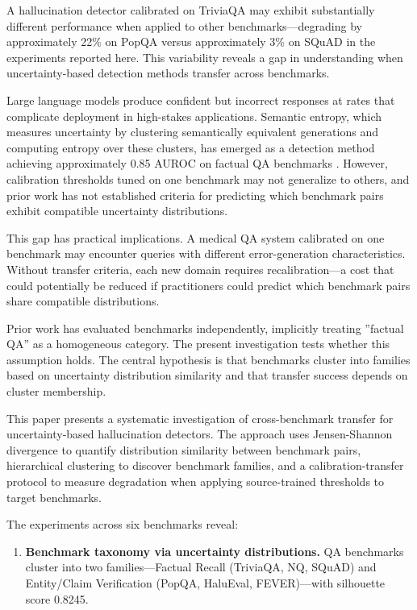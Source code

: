 
A hallucination detector calibrated on TriviaQA may exhibit substantially different performance when applied to other benchmarks---degrading by approximately 22\% on PopQA versus approximately 3\% on SQuAD in the experiments reported here. This variability reveals a gap in understanding when uncertainty-based detection methods transfer across benchmarks.

Large language models produce confident but incorrect responses at rates that complicate deployment in high-stakes applications. Semantic entropy, which measures uncertainty by clustering semantically equivalent generations and computing entropy over these clusters, has emerged as a detection method achieving approximately 0.85 AUROC on factual QA benchmarks \citep{kuhn2023semantic}. However, calibration thresholds tuned on one benchmark may not generalize to others, and prior work has not established criteria for predicting which benchmark pairs exhibit compatible uncertainty distributions.

This gap has practical implications. A medical QA system calibrated on one benchmark may encounter queries with different error-generation characteristics. Without transfer criteria, each new domain requires recalibration---a cost that could potentially be reduced if practitioners could predict which benchmark pairs share compatible distributions.

Prior work has evaluated benchmarks independently, implicitly treating ''factual QA'' as a homogeneous category. The present investigation tests whether this assumption holds. The central hypothesis is that benchmarks cluster into families based on uncertainty distribution similarity and that transfer success depends on cluster membership.

This paper presents a systematic investigation of cross-benchmark transfer for uncertainty-based hallucination detectors. The approach uses Jensen-Shannon divergence to quantify distribution similarity between benchmark pairs, hierarchical clustering to discover benchmark families, and a calibration-transfer protocol to measure degradation when applying source-trained thresholds to target benchmarks.

The experiments across six benchmarks reveal:

\begin{enumerate}
\item \textbf{Benchmark taxonomy via uncertainty distributions.} QA benchmarks cluster into two families---Factual Recall (TriviaQA, NQ, SQuAD) and Entity/Claim Verification (PopQA, HaluEval, FEVER)---with silhouette score 0.8245.
\end{enumerate}

